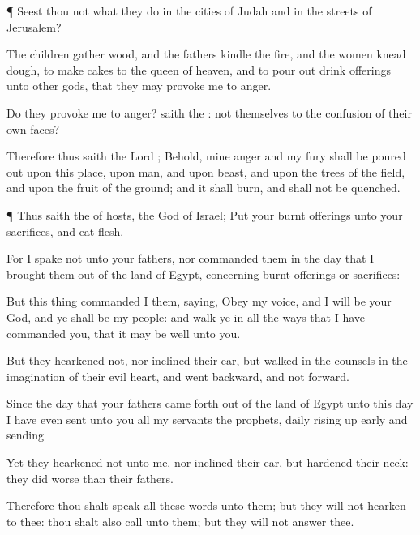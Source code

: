 {\par }{\PP {}¶
Seest thou not what they
do in the
cities of
Judah and in the
streets of
Jerusalem?

The
children
gather
wood, and the
fathers
kindle the
fire, and the
women
knead
{}
dough, to
make
cakes to the
queen of
heaven, and to pour
out drink
offerings unto
other
gods, that they may provoke me to
anger.

Do they provoke me to
anger?
saith the
{}:
{} not
{} themselves to the
confusion of their own
faces?

Therefore thus
saith the
Lord
{}; Behold, mine
anger and my
fury shall be poured
out upon this
place, upon
man, and upon
beast, and upon the
trees of the
field, and upon the
fruit of the
ground; and it shall
burn, and shall not be
quenched.


\par }{\PP {}¶ Thus
saith the
{} of
hosts, the
God of
Israel;
Put your burnt
offerings unto your
sacrifices, and
eat
flesh.

For I
spake not unto your
fathers, nor
commanded them in the
day that I brought them
out of the
land of
Egypt,
concerning burnt
offerings or
sacrifices:

But this
thing
commanded I them,
saying,
Obey my
voice, and I will be your
God, and ye shall be my
people: and
walk ye in all the
ways that I have
commanded you, that it may be
well unto you.

But they
hearkened not, nor
inclined their
ear, but
walked in the
counsels
{} in the
imagination of their
evil
heart, and went
backward, and not
forward.

Since the
day that your
fathers came forth
out of the
land of
Egypt unto this
day I have even
sent unto you all my
servants the
prophets,
daily rising up
early and
sending
{}

Yet they
hearkened not unto me, nor
inclined their
ear, but
hardened their
neck: they did
worse than their
fathers.

Therefore thou shalt
speak all these
words unto them; but they will not
hearken to thee: thou shalt also
call unto them; but they will not
answer thee.

}
